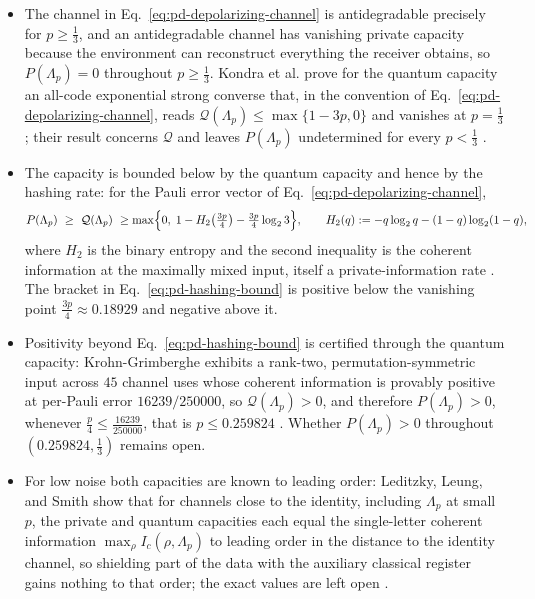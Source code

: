 \begin{itemize}
  \item The channel in Eq.~\eqref{eq:pd-depolarizing-channel} is antidegradable
  precisely for $p\ge\tfrac{1}{3}$, and an antidegradable channel has
  vanishing private capacity because the environment can reconstruct
  everything the receiver obtains, so $P(\Lambda_p)=0$ throughout
  $p\ge\tfrac{1}{3}$.  Kondra et al. prove for the quantum capacity an
  all-code exponential strong converse that, in the convention of
  Eq.~\eqref{eq:pd-depolarizing-channel}, reads
  $\mathcal Q(\Lambda_p)\le\max\{1-3p,0\}$ and vanishes at $p=\tfrac{1}{3}$;
  their result concerns $\mathcal Q$ and leaves $P(\Lambda_p)$ undetermined
  for every $p<\tfrac{1}{3}$ .

  \item The capacity is bounded below by the quantum capacity and hence by the
  hashing rate: for the Pauli error vector of
  Eq.~\eqref{eq:pd-depolarizing-channel},
  \begin{equation}
    P(\Lambda_p)\ \ge\ \mathcal Q(\Lambda_p)\ \ge
    \max\Bigl\{0,\;1-H_2\bigl(\tfrac{3p}{4}\bigr)
    -\tfrac{3p}{4}\log_2 3\Bigr\},
    \qquad
    H_2(q):=-q\log_2 q-(1-q)\log_2(1-q),
    \label{eq:pd-hashing-bound}
  \end{equation}
  where $H_2$ is the binary entropy and the second inequality is the coherent
  information at the maximally mixed input, itself a private-information rate
  .  The bracket in
  Eq.~\eqref{eq:pd-hashing-bound} is positive below the vanishing point
  $\tfrac{3p}{4}\approx0.18929$ and negative above it.

  \item Positivity beyond Eq.~\eqref{eq:pd-hashing-bound} is certified through the
  quantum capacity: Krohn-Grimberghe exhibits a rank-two,
  permutation-symmetric input across $45$ channel uses whose coherent
  information is provably positive at per-Pauli error $16239/250000$, so
  $\mathcal Q(\Lambda_p)>0$, and therefore $P(\Lambda_p)>0$, whenever
  $\tfrac{p}{4}\le\tfrac{16239}{250000}$, that is $p\le0.259824$
  .  Whether $P(\Lambda_p)>0$
  throughout $(0.259824,\tfrac{1}{3})$ remains open.

  \item For low noise both capacities are known to leading order: Leditzky, Leung,
  and Smith show that for channels close to the identity, including
  $\Lambda_p$ at small $p$, the private and quantum capacities each equal the
  single-letter coherent information $\max_\rho I_c(\rho,\Lambda_p)$ to
  leading order in the distance to the identity channel, so shielding part of
  the data with the auxiliary classical register gains nothing to that order;
  the exact values are left open
  .


\end{itemize}
